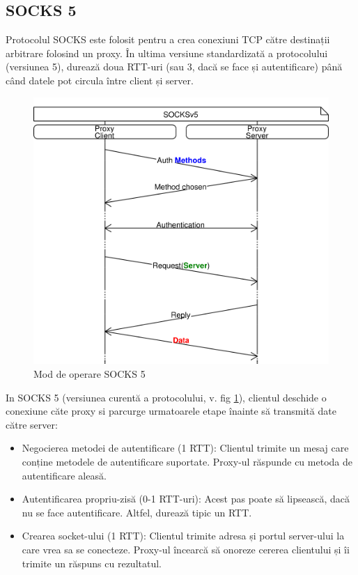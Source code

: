 \subsection{SOCKS 5}

Protocolul SOCKS este folosit pentru a crea conexiuni TCP către
destinații arbitrare folosind un proxy.  În ultima versiune
standardizată a protocolului (versiunea 5), durează doua RTT-uri (sau
3, dacă se face și autentificare) până când datele pot circula între
client și server.

\begin{figure}[h]
	\centering
	\includegraphics[scale=0.7]{figures/socks/socks5op.png}
	\caption{Mod de operare SOCKS 5}
    	\label{fig:socks5op}
\end{figure}

In SOCKS 5 (versiunea curentă a protocolului, v. fig
\ref{fig:socks5op}), clientul deschide o conexiune căte proxy si
parcurge urmatoarele etape înainte să transmită date către server:
\begin{itemize}
	\item Negocierea metodei de autentificare (1 RTT): Clientul trimite un mesaj care conține metodele de autentificare suportate. Proxy-ul răspunde cu metoda de autentificare aleasă.
	\item Autentificarea propriu-zisă (0-1 RTT-uri): Acest pas poate să lipsească, dacă nu se face autentificare. Altfel, durează tipic un RTT.
	\item Crearea socket-ului (1 RTT): Clientul trimite adresa și portul server-ului la care vrea sa se conecteze. Proxy-ul încearcă să onoreze cererea clientului și îi trimite un răspuns cu rezultatul.
\end{itemize}


